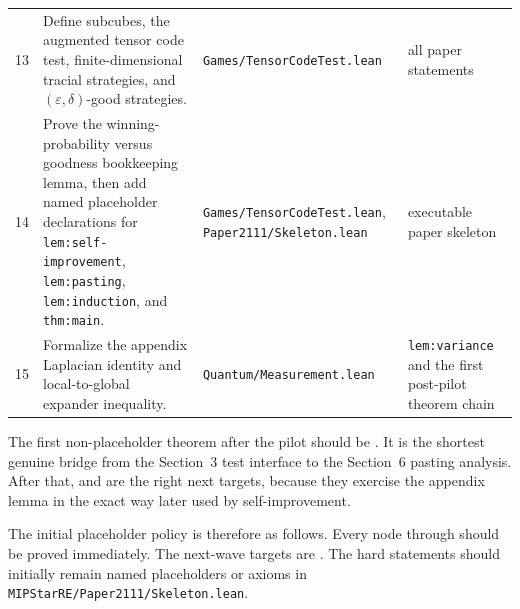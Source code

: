 \documentclass{article}
\theoremstyle{remark}
\newcommand{\eps}{\varepsilon}
\begin{document}
\begin{longtable}{L{0.05\textwidth}L{0.49\textwidth}L{0.23\textwidth}L{0.17\textwidth}}
13 & Define subcubes, the augmented tensor code test, finite-dimensional tracial strategies, and $(\eps,\delta)$-good strategies. & \texttt{Games/TensorCodeTest.lean} & all paper statements \\
14 & Prove the winning-probability versus goodness bookkeeping lemma, then add named placeholder declarations for \texttt{lem:self-improvement}, \texttt{lem:pasting}, \texttt{lem:induction}, and \texttt{thm:main}. & \texttt{Games/TensorCodeTest.lean}, \texttt{Paper2111/Skeleton.lean} & executable paper skeleton \\
15 & Formalize the appendix Laplacian identity and local-to-global expander inequality. & \texttt{Quantum/Measurement.lean} & \texttt{lem:variance} and the first post-pilot theorem chain \\
\bottomrule
\end{longtable}
\normalsize

The first non-placeholder theorem after the pilot should be . It is the shortest genuine bridge from the Section~3 test interface to the Section~6 pasting analysis. After that,  and  are the right next targets, because they exercise the appendix lemma in the exact way later used by self-improvement.

The initial placeholder policy is therefore as follows. Every node through  should be proved immediately. The next-wave targets are . The hard statements  should initially remain named placeholders or axioms in \texttt{MIPStarRE/Paper2111/Skeleton.lean}.
\end{document}
